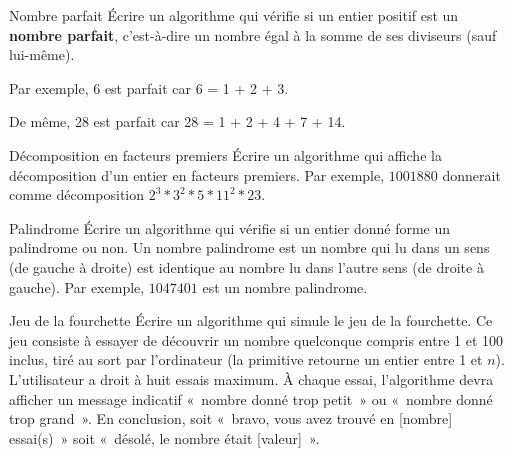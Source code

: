 \begin{Exercice}{Nombre parfait}
	Écrire un algorithme qui vérifie si un entier positif est un
	\textbf{nombre parfait}, c’est-à-dire un nombre égal à la somme de ses
	diviseurs (sauf lui-même). 
	
	Par exemple, 6 est parfait car 6 = 1 + 2 + 3. 
	
	De même, 28 est parfait car 28 = 1 + 2 + 4 + 7 + 14.
\end{Exercice}

\begin{Exercice}{Décomposition en facteurs premiers}
	Écrire un algorithme qui affiche la décomposition 
	d’un entier en facteurs premiers. 
	Par exemple, $1001880$ donnerait comme décomposition
	$2^3 * 3^2 * 5 * 11^2 * 23$.
\end{Exercice}

\begin{Exercice}{Palindrome}
	Écrire un algorithme qui vérifie si un entier donné 
	forme un palindrome ou non. 
	Un nombre palindrome est un nombre qui lu dans un sens 
	(de gauche à droite) est identique au nombre lu dans l’autre sens 
	(de droite à gauche). 
	Par exemple, $1047401$ est un nombre palindrome.
\end{Exercice}

\begin{Exercice}{Jeu de la fourchette}
	Écrire un algorithme qui simule le jeu de la
	fourchette. Ce jeu consiste à essayer de découvrir un nombre quelconque
	compris entre 1 et 100 inclus, tiré au sort par l’ordinateur (la primitive
	 retourne un entier entre 1 et $n$). 
	L’utilisateur a droit à huit essais
	maximum. À chaque essai, l’algorithme devra afficher un message
	indicatif «~nombre donné trop petit~» ou «~nombre donné trop grand~».
	En conclusion, soit «~bravo, vous avez trouvé en [nombre] essai(s)~» soit
	«~désolé, le nombre était [valeur]~».
\end{Exercice}

